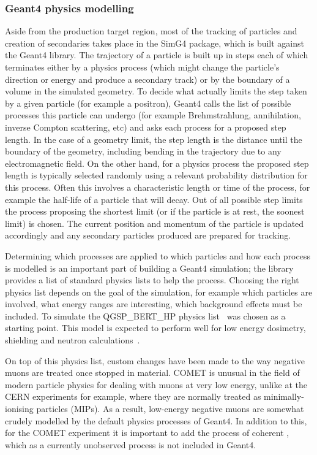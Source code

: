 \subsubsection{Geant4 physics modelling}
Aside from the production target region, most of the tracking of particles and creation of secondaries takes place in the SimG4 package, which is built against the Geant4 library.
The trajectory of a particle is built up in steps each of which terminates either by a physics process (which might change the particle's direction or energy and produce a secondary track) or by the boundary of a volume in the simulated geometry.
To decide what actually limits the step taken by a given particle (for example a positron), Geant4 calls the list of possible processes this particle can undergo (for example Brehmstrahlung, annihilation, inverse Compton scattering, etc) and asks each process for a proposed step length. 
In the case of a geometry limit, the step length is the distance until the boundary of the geometry, including bending in the trajectory due to any electromagnetic field.
On the other hand, for a physics process the proposed step length is typically selected randomly using a relevant probability distribution for this process.
Often this involves a characteristic length or time of the process, for example the half-life of a particle that will decay.
Out of all possible step limits the process proposing the shortest limit (or if the particle is at rest, the soonest limit) is chosen.
The current position and momentum of the particle is updated accordingly and any secondary particles produced are prepared for tracking.

Determining which processes are applied to which particles and how each process is modelled is an important part of building a Geant4 simulation; the library provides a list of standard physics lists to help the process.
Choosing the right physics list depends on the goal of the simulation, for example which particles are involved, what energy ranges are interesting, which background effects must be included.
To simulate \COMET the QGSP\_BERT\_HP physics list~\cite{Geant4:physicsLists} was chosen as a starting point.
This model is expected to perform well for low energy dosimetry, shielding and neutron calculations~\cite{Geant4:PhysicsListsRecommends}.

On top of this physics list, custom changes have been made to the way negative muons are treated once stopped in material.
COMET is unusual in the field of modern particle physics for dealing with muons at very low energy, unlike at the \ac{CERN} experiments for example, where they are normally treated as minimally-ionising particles (MIPs).
As a result,  low-energy negative muons are somewhat crudely modelled by the default physics processes of Geant4.
In addition to this, for the COMET experiment it is important to add the process of coherent \mueconv, which as a currently unobserved process is not included in Geant4.

